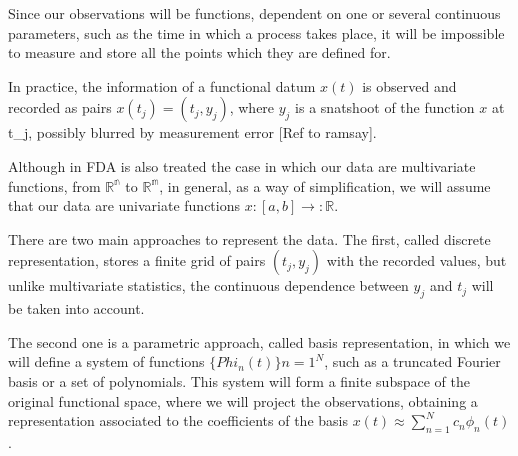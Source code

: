 Since our observations will be functions, dependent on one or several continuous parameters, such as the time in which a process takes place, it will be impossible to measure and store all the points which they are defined for.

In practice, the information of a functional datum $x(t)$ is observed and recorded as pairs $x(t_j) = (t_j, y_j)$, where $y_j$ is a snatshoot of the function $x$ at t_j, possibly blurred by measurement error [Ref to ramsay].

Although in FDA is also treated the case in which our data are multivariate functions, from  $\mathbb{R^n}$ to $\mathbb{R^m}$, in general, as a way of simplification, we will assume that our data are univariate functions $x:[a,b] \rightarrow :\mathbb{R}$.

There are two main approaches to represent the data. The first, called discrete representation, stores a finite grid of pairs $(t_j, y_j)$ with the recorded values, but unlike multivariate statistics, the continuous dependence between $y_j$ and $t_j$ will be taken into account.

The second one is a parametric approach, called basis representation, in which we will define a system of functions $\{Phi_n(t) \}{n=1}^N$, such as a truncated Fourier basis or a set of polynomials. This system will form a finite subspace of the original functional space, where we will project the observations, obtaining a representation associated to the coefficients of the basis $x(t) \approx \sum_{n=1}^N c_n\phi_n(t)$.
